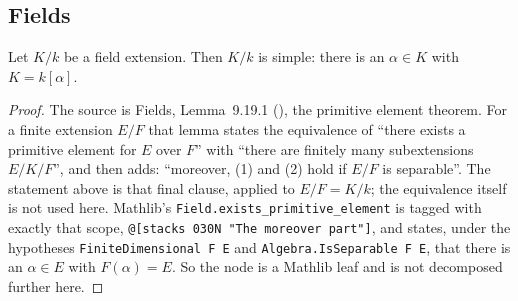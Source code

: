
\subsection{Fields}

\begin{lemma}
\label{lem:pc-primitive-element}
Let $K/k$ be a  field
extension.  Then $K/k$ is simple: there is an $\alpha\in K$ with
$K=k[\alpha]$.
\mathlibok\ 
\end{lemma}
\begin{proof}
The source is Fields, Lemma~9.19.1 (), the
primitive element theorem.  For a finite extension $E/F$ that lemma
states the equivalence of ``there exists a primitive element for $E$
over $F$'' with ``there are finitely many subextensions $E/K/F$'', and
then adds: ``moreover, (1) and (2) hold if $E/F$ is separable''.  The
statement above is that final clause, applied to $E/F=K/k$; the
equivalence itself is not used here.  Mathlib's
\texttt{Field.exists\_primitive\_element} is tagged with exactly that
scope, \texttt{@[stacks 030N "The moreover part"]}, and states, under
the hypotheses \texttt{FiniteDimensional F E} and
\texttt{Algebra.IsSeparable F E}, that there is an $\alpha\in E$ with
$F(\alpha)=E$.  So the node is a Mathlib leaf and is not decomposed
further here.
\end{proof}

